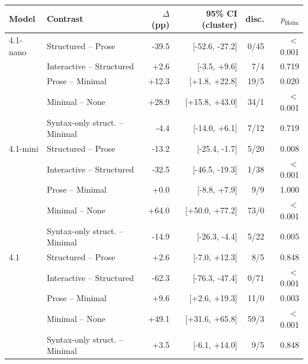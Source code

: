 \begin{tabular}{llrrrr}
\toprule
Model & Contrast & $\Delta$ (pp) & 95\% CI (cluster) & disc. & $p_\text{Holm}$ \\
\midrule
4.1-nano & Structured -- Prose & -39.5 & [-52.6, -27.2] & 0/45 & $<$0.001 \\
 & Interactive -- Structured & +2.6 & [-3.5, +9.6] & 7/4 & 0.719 \\
 & Prose -- Minimal & +12.3 & [+1.8, +22.8] & 19/5 & 0.020 \\
 & Minimal -- None & +28.9 & [+15.8, +43.0] & 34/1 & $<$0.001 \\
 & Syntax-only struct. -- Minimal & -4.4 & [-14.0, +6.1] & 7/12 & 0.719 \\
\midrule
4.1-mini & Structured -- Prose & -13.2 & [-25.4, -1.7] & 5/20 & 0.008 \\
 & Interactive -- Structured & -32.5 & [-46.5, -19.3] & 1/38 & $<$0.001 \\
 & Prose -- Minimal & +0.0 & [-8.8, +7.9] & 9/9 & 1.000 \\
 & Minimal -- None & +64.0 & [+50.0, +77.2] & 73/0 & $<$0.001 \\
 & Syntax-only struct. -- Minimal & -14.9 & [-26.3, -4.4] & 5/22 & 0.005 \\
\midrule
4.1 & Structured -- Prose & +2.6 & [-7.0, +12.3] & 8/5 & 0.848 \\
 & Interactive -- Structured & -62.3 & [-76.3, -47.4] & 0/71 & $<$0.001 \\
 & Prose -- Minimal & +9.6 & [+2.6, +19.3] & 11/0 & 0.003 \\
 & Minimal -- None & +49.1 & [+31.6, +65.8] & 59/3 & $<$0.001 \\
 & Syntax-only struct. -- Minimal & +3.5 & [-6.1, +14.0] & 9/5 & 0.848 \\
\bottomrule
\end{tabular}